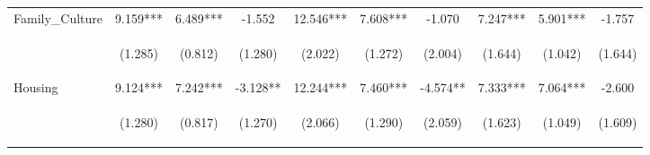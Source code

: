 \begin{tabular}{lccccccccc}
\noalign{\smallskip}Family_Culture & 9.159*** & 6.489*** & -1.552 & 12.546*** & 7.608*** & -1.070 & 7.247*** & 5.901*** & -1.757\\
 & \begin{footnotesize}(1.285)\end{footnotesize} & \begin{footnotesize}(0.812)\end{footnotesize} & \begin{footnotesize}(1.280)\end{footnotesize} & \begin{footnotesize}(2.022)\end{footnotesize} & \begin{footnotesize}(1.272)\end{footnotesize} & \begin{footnotesize}(2.004)\end{footnotesize} & \begin{footnotesize}(1.644)\end{footnotesize} & \begin{footnotesize}(1.042)\end{footnotesize} & \begin{footnotesize}(1.644)\end{footnotesize}\\
\noalign{\smallskip}Housing & 9.124*** & 7.242*** & -3.128** & 12.244*** & 7.460*** & -4.574** & 7.333*** & 7.064*** & -2.600\\
 & \begin{footnotesize}(1.280)\end{footnotesize} & \begin{footnotesize}(0.817)\end{footnotesize} & \begin{footnotesize}(1.270)\end{footnotesize} & \begin{footnotesize}(2.066)\end{footnotesize} & \begin{footnotesize}(1.290)\end{footnotesize} & \begin{footnotesize}(2.059)\end{footnotesize} & \begin{footnotesize}(1.623)\end{footnotesize} & \begin{footnotesize}(1.049)\end{footnotesize} & \begin{footnotesize}(1.609)\end{footnotesize}\\

\end{tabular}
